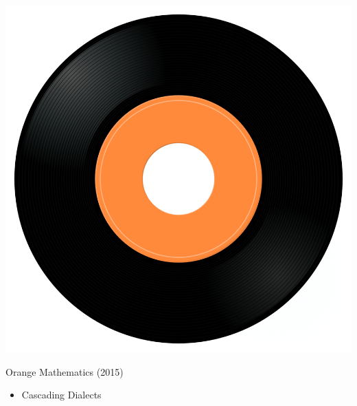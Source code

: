 \begin{minipage}[t]{0.25\textwidth}
\captionsetup{type=figure}
\includegraphics[width=\textwidth]{Images/cover.png}
\caption*{Orange Mathematics (2015)}
\end{minipage}
\begin{minipage}[t]{0.25\textwidth}\vspace{0pt}
\begin{itemize}[nosep,leftmargin=1em,labelwidth=*,align=left]
	\setlength{\itemsep}{0pt}
	\item Cascading Dialects
\end{itemize}
\end{minipage}
